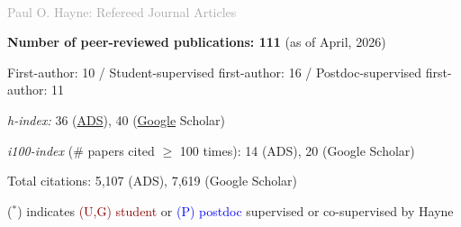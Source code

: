 \documentclass[letterpaper,10pt,twoside]{article}
\begin{document}
\begin{tabular}{@{} l l}
\end{tabular}

\vspace{0.05in}


\hrulefill 
\vspace{0.05in}\\
{\large\textcolor{darkgray}{Paul O. Hayne: Refereed Journal Articles}}

\vspace{0.05in}
{\small

\hspace{0.1in}\textbf{Number of peer-reviewed publications: 111} (as of April, 2026)

\hspace{0.25in}First-author: 10 / Student-supervised first-author: 16 / Postdoc-supervised first-author: 11

\hspace{0.1in}\textit{h-index:} 36 (\href{https://ui.adsabs.harvard.edu/search/filter_author_facet_hier_fq_author=AND&filter_author_facet_hier_fq_author=author_facet_hier%3A%220%2FHayne%2C%20P%22&fq=%7B!type%3Daqp%20v%3D%24fq_author%7D&fq_author=(author_facet_hier%3A%220%2FHayne%2C%20P%22)&q=%20author%3A%22Hayne%2C%20Paul%20O%22&sort=date%20desc%2C%20bibcode%20desc/metrics}{ADS}), 40 (\href{https://scholar.google.com/citations?hl=en&user=kgXwvksAAAAJ}{Google} Scholar)

\hspace{0.1in}\textit{i100-index} (\# papers cited $\ge$ 100 times): 14 (ADS), 20 (Google Scholar)

\hspace{0.1in}Total citations: 5,107 (ADS), 7,619 (Google Scholar)

\hspace{0.1in}($^*$) indicates \textcolor{darkred}{(U,G) student} or \textcolor{blue}{(P) postdoc} supervised or co-supervised by Hayne
}
\end{document}
